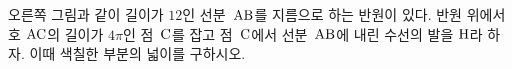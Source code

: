 \noindent\begin{minipage}[t]{0.58\linewidth}\vspace{0pt}\raggedright 오른쪽 그림과 같이 길이가 $12$인 선분~$\mathrm{AB}$를 지름으로 하는 반원이 있다. 반원 위에서 호 $\mathrm{AC}$의 길이가 $4\pi$인 점~$\mathrm{C}$를 잡고 점~$\mathrm{C}$에서 선분~$\mathrm{AB}$에 내린 수선의 발을 $\mathrm{H}$라 하자. 이때 색칠한 부분의 넓이를 구하시오.\end{minipage}\hfill\begin{minipage}[t]{0.4\linewidth}\vspace{0pt}\centering \resizebox{\ifdim\width>\linewidth\linewidth\else\width\fi}{!}{}\end{minipage}\par
